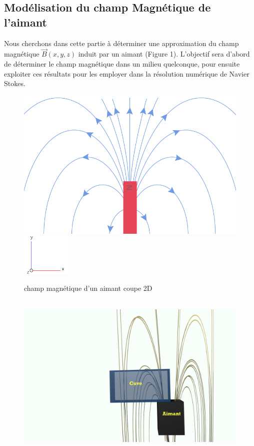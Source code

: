 \documentclass[a4paper,12pt,titlepage]{report}
\begin{document}
\begin{onehalfspace}
\newpage
\chapter{Modélisation du champ Magnétique de l'aimant}

Nous cherchons dans cette partie à déterminer une approximation du champ magnétique $\vec{B}(x,y,z)$ induit par un aimant (Figure 1). L'objectif sera d'abord de déterminer le champ magnétique dans un milieu quelconque, pour ensuite exploiter ces résultats pour les employer dans la résolution numérique de Navier Stokes. 
\begin{figure}[h]
\begin{center}
\includegraphics[height =4 cm, keepaspectratio]{graphes/champ_aimant1.png} %
\includegraphics[height = 2cm, keepaspectratio]{graphes/axes.png}
\caption{champ magnétique d'un aimant coupe 2D}
\label{figure 1}
\end{center}
\end{figure}
\newline
\begin{figure}[!h]
\begin{center}
\centering
\includegraphics[height = 8cm, keepaspectratio]{graphes/blender_cuve_mag2.png} 

\end{center}
\end{figure}
\end{onehalfspace}
\end{document}
